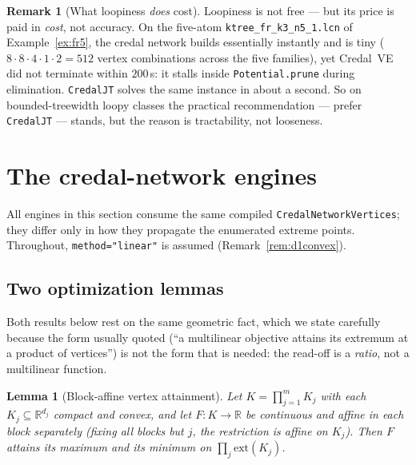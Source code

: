 \documentclass[11pt]{article}
\newtheorem{lemma}{Lemma}
\theoremstyle{definition}
\newtheorem{remark}{Remark}
\newcommand{\ext}{\mathrm{ext}}
\begin{document}
\begin{remark}[What loopiness \emph{does} cost]\label{rem:loopycost}
Loopiness is not free --- but its price is paid in \emph{cost}, not accuracy. On the five-atom
\texttt{ktree\_fr\_k3\_n5\_1.lcn} of Example~\ref{ex:fr5}, the credal network builds essentially
instantly and is tiny ($8\cdot8\cdot4\cdot1\cdot2=512$ vertex combinations across the five families),
yet Credal~VE did not terminate within $200$\,s: it stalls inside \texttt{Potential.prune} during
elimination. \texttt{CredalJT} solves the same instance in about a second. So on bounded-treewidth
loopy classes the practical recommendation --- prefer \texttt{CredalJT} --- stands, but the reason is
tractability, not looseness.
\end{remark}

\section{The credal-network engines}\label{sec:cnfamily}

All engines in this section consume the same compiled \texttt{CredalNetworkVertices}; they differ only
in how they propagate the enumerated extreme points. Throughout, \texttt{method="linear"} is assumed
(Remark~\ref{rem:d1convex}).

\subsection{Two optimization lemmas}\label{sec:optlemmas}
Both results below rest on the same geometric fact, which we state carefully because the form usually
quoted (``a multilinear objective attains its extremum at a product of vertices'') is not the form
that is needed: the read-off is a \emph{ratio}, not a multilinear function.

\begin{lemma}[Block-affine vertex attainment]\label{lem:bauer}
Let $K=\prod_{j=1}^m K_j$ with each $K_j\subseteq\mathbb R^{d_j}$ compact and convex, and let
$F:K\to\mathbb R$ be continuous and \emph{affine in each block separately} (fixing all blocks but
$j$, the restriction is affine on $K_j$). Then $F$ attains its maximum and its minimum on
$\prod_j\ext(K_j)$.
\end{lemma}
\end{document}
